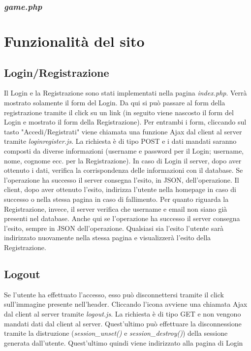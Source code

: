 \documentclass[12pt]{extarticle}
\begin{document}
\subsubsection{\textit{game.php}}

\section{Funzionalità del sito}

\subsection{Login/Registrazione}
Il Login e la Registrazione sono stati implementati nella pagina \textit{index.php}. Verrà mostrato
solamente il form del Login. Da qui si può passare al form della registrazione tramite il click su un
link (in seguito viene nascosto il form del Login e mostrato il form della Registrazione).
Per entrambi i form, cliccando sul tasto "Accedi/Registrati" viene chiamata una funzione Ajax
dal client al server tramite \textit{loginregister.js}. La richiesta è di tipo POST e i dati mandati
saranno composti da diverse informazioni (username e password per il Login; username, nome,
cognome ecc. per la Registrazione). In caso di Login il server, dopo aver ottenuto i dati, verifica la
corrispondenza delle informazioni con il database. Se l'operazione ha successo il server
consegna l'esito, in JSON, dell'operazione. Il client, dopo aver ottenuto l'esito, indirizza l'utente
nella homepage in caso di successo o nella stessa pagina in caso di fallimento. Per quanto
riguarda la Registrazione, invece, il server verifica che username e email non siano già presenti nel
database. Anche qui se l'operazione ha successo il server consegna l'esito, sempre in JSON
dell'operazione. Qualsiasi sia l'esito l'utente sarà indirizzato nuovamente nella stessa pagina e
visualizzerà l'esito della Registrazione.

\subsection{Logout}
Se l'utente ha effettuato l'accesso, esso può disconnettersi tramite il click sull'immagine presente
nell'header. Cliccando l'icona avviene una chiamata Ajax dal client al server tramite \textit{logout.js}.
La richiesta è di tipo GET e non vengono mandati dati dal client al server. Quest'ultimo può
effettuare la disconnessione tramite la distruzione (\textit{session\_unset()} e \textit{session\_destroy()}) della
sessione generata dall'utente. Quest'ultimo quindi viene indirizzato alla pagina di Login
\end{document}
